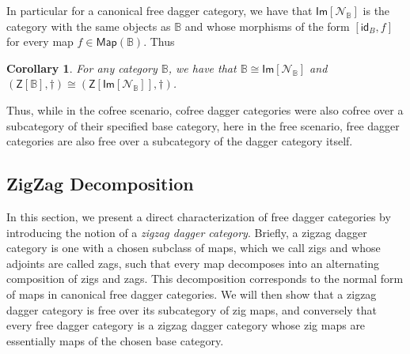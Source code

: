 \documentclass[10pt]{article}
\newtheorem{corollary}[observation]{Corollary}
\begin{document}
In particular for a canonical free dagger category, we have that $\mathsf{Im}[\mathcal{N}_\mathbb{B}]$ is the category with the same objects as $\mathbb{B}$ and whose morphisms of the form $[\mathsf{id}_B, f]$ for every map $f \in \mathsf{Map}(\mathbb{B})$. Thus 

\begin{corollary} For any category $\mathbb{B}$, we have that $\mathbb{B} \cong \mathsf{Im}[\mathcal{N}_\mathbb{B}]$ and $(\mathsf{Z}[\mathbb{B}], \dagger) \cong (\mathsf{Z}\left[ \mathsf{Im}[\mathcal{N}_\mathbb{B}] \right], \dagger)$.  
\end{corollary}

Thus, while in the cofree scenario, cofree dagger categories were also cofree over a subcategory of their specified base category, here in the free scenario, free dagger categories are also free over a subcategory of the dagger category itself. 

\subsection{ZigZag Decomposition}\label{sec:zigzag-decomp}

In this section, we present a direct characterization of free dagger categories by introducing the notion of a \textit{zigzag dagger category}. Briefly, a zigzag dagger category is one with a chosen subclass of maps, which we call zigs and whose adjoints are called zags, such that every map decomposes into an alternating composition of zigs and zags. This decomposition corresponds to the normal form of maps in canonical free dagger categories. We will then show that a zigzag dagger category is free over its subcategory of zig maps, and conversely that every free dagger category is a zigzag dagger category whose zig maps are essentially maps of the chosen base category. 
\end{document}
